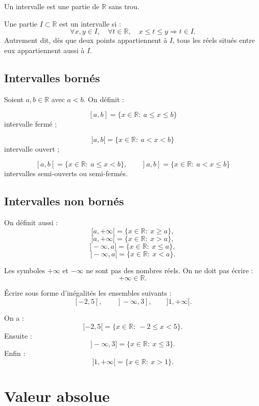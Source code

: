 \documentclass[11pt,a4paper]{article}
\newcommand{\R}{\mathbb R}
\newcommand{\implique}{\Longrightarrow}
\begin{document}
Un intervalle est une partie de \(\R\) sans trou.

\begin{definitionbox}[Intervalle]
Une partie \(I\subset\R\) est un intervalle si :
\[
\forall x,y\in I,\quad \forall t\in\R,\quad
x\leq t\leq y \implique t\in I.
\]
Autrement dit, dès que deux points appartiennent à \(I\), tous les réels situés entre eux appartiennent aussi à \(I\).
\end{definitionbox}

\subsection{Intervalles bornés}

Soient \(a,b\in\R\) avec \(a<b\). On définit :

\[
[a,b]=\{x\in\R:\ a\leq x\leq b\}
\]
intervalle fermé ;

\[
]a,b[=\{x\in\R:\ a<x<b\}
\]
intervalle ouvert ;

\[
[a,b[=\{x\in\R:\ a\leq x<b\},
\qquad
]a,b]=\{x\in\R:\ a<x\leq b\}
\]
intervalles semi-ouverts ou semi-fermés.

\subsection{Intervalles non bornés}

On définit aussi :
\[
[a,+\infty[=\{x\in\R:\ x\geq a\},
\]
\[
]a,+\infty[=\{x\in\R:\ x>a\},
\]
\[
]-\infty,a]=\{x\in\R:\ x\leq a\},
\]
\[
]-\infty,a[=\{x\in\R:\ x<a\}.
\]

\begin{retenirbox}
Les symboles \(+\infty\) et \(-\infty\) ne sont pas des nombres réels.  
On ne doit pas écrire :
\[
+\infty\in\R.
\]
\end{retenirbox}

\begin{exercicebox}[Intervalles]
Écrire sous forme d'inégalités les ensembles suivants :
\[
[-2,5[,\qquad ]-\infty,3],\qquad ]1,+\infty[.
\]
\end{exercicebox}

\begin{correctionbox}
On a :
\[
[-2,5[=\{x\in\R:\ -2\leq x<5\}.
\]
Ensuite :
\[
]-\infty,3]=\{x\in\R:\ x\leq3\}.
\]
Enfin :
\[
]1,+\infty[=\{x\in\R:\ x>1\}.
\]
\end{correctionbox}

\section{Valeur absolue}
\end{document}
